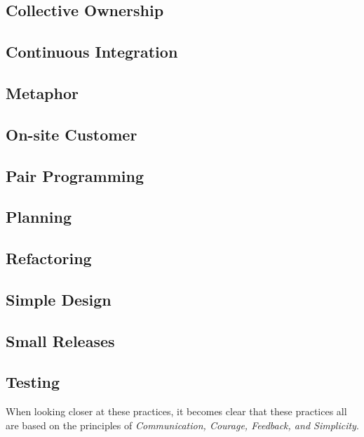 \subsection{Collective Ownership}

\subsection{Continuous Integration}

\subsection{Metaphor}

\subsection{On-site Customer}

\subsection{Pair Programming}

\subsection{Planning}

\subsection{Refactoring}

\subsection{Simple Design}

\subsection{Small Releases}

\subsection{Testing}













When looking closer at these practices, it becomes clear that these practices all are based on the principles of \textit{Communication, Courage, Feedback, and Simplicity}.